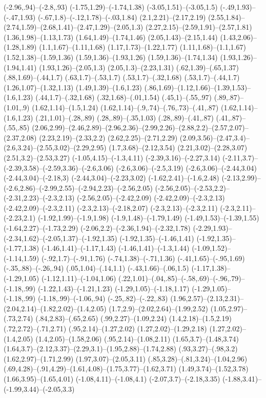 {(-2.96,.94)--(-2.8,.93) (-1.75,1.29)--(-1.74,1.38) (-3.05,1.51)--(-3.05,1.5) (-.49,1.93)--(-.47,1.93) (-.67,1.8)--(-.12,1.78)--(-.03,1.84) (2.1,2.21)--(2.17,2.19) (2.55,1.84)--(2.74,1.59)--(2.68,1.41)--(2.47,1.29)--(2.05,1.3) (2.27,2.15)--(2.59,1.91)--(2.57,1.81) (1.36,1.98)--(1.13,1.73) (1.64,1.49)--(1.74,1.46) (2.05,1.43)--(2.15,1.44) (1.43,2.06)--(1.28,1.89) (1.1,1.67)--(1.11,1.68) (1.17,1.73)--(1.22,1.77) (1.11,1.68)--(1.1,1.67) (1.52,1.38)--(1.59,1.36) (1.59,1.36)--(1.93,1.26) (1.59,1.36)--(1.74,1.34) (1.93,1.26)--(1.94,1.41) (1.93,1.26)--(2.05,1.3) (2.05,1.3)--(2.23,1.31) (.62,1.39)--(.65,1.37) (.88,1.69)--(.44,1.7) (.63,1.7)--(.53,1.7) (.53,1.7)--(.32,1.68) (.53,1.7)--(.44,1.7) (1.26,1.07)--(1.32,1.13) (1.49,1.39)--(1.6,1.23) (.86,1.69)--(1.12,1.66)--(1.39,1.53)--(1.6,1.23) (.44,1.7)--(.32,1.68) (.32,1.68)--(.01,1.54) (.45,1)--(.55,.97) (.89,.87)--(1.01,.9) (1.62,1.14)--(1.5,1.24) (1.62,1.14)--(.9,.74)--(.76,.73)--(.41,.87) (1.62,1.14)--(1.6,1.23) (.21,1.01)--(.28,.89) (.28,.89)--(.35,1.03) (.28,.89)--(.41,.87) (.41,.87)--(.55,.85) (2.06,2.99)--(2.46,2.89)--(2.96,2.36)--(2.99,2.26)--(2.88,2.2)--(2.57,2.07)--(2.37,2.08) (2.23,2.19)--(2.33,2.2) (2.62,2.25)--(2.71,2.29) (2.09,3.56)--(2.47,3.4)--(2.6,3.24)--(2.55,3.02)--(2.29,2.95) (1.7,3.68)--(2.12,3.54) (2.21,3.02)--(2.28,3.07) (2.51,3.2)--(2.53,3.27) (-1.05,4.15)--(-1.3,4.11) (-2.39,3.16)--(-2.27,3.14) (-2.11,3.7)--(-2.39,3.58)--(-2.59,3.36)--(-2.6,3.06) (-2.6,3.06)--(-2.5,3.19) (-2.6,3.06)--(-2.44,3.04) (-2.44,3.04)--(-2.18,3) (-2.44,3.04)--(-2.23,3.02) (-1.62,2.41)--(-1.6,2.48) (-2.13,2.99)--(-2.6,2.86)--(-2.99,2.55)--(-2.94,2.23)--(-2.56,2.05) (-2.56,2.05)--(-2.53,2.2)--(-2.31,2.23)--(-2.3,2.13) (-2.56,2.05)--(-2.42,2.09) (-2.42,2.09)--(-2.3,2.13) (-2.42,2.09)--(-2.3,2.11) (-2.3,2.13)--(-2.18,2.07) (-2.3,2.13)--(-2.3,2.11) (-2.3,2.11)--(-2.23,2.1) (-1.92,1.99)--(-1.9,1.98) (-1.9,1.48)--(-1.79,1.49) (-1.49,1.53)--(-1.39,1.55) (-1.64,2.27)--(-1.73,2.29) (-2.06,2.2)--(-2.36,1.94)--(-2.32,1.78) (-2.29,1.93)--(-2.34,1.62)--(-2.05,1.37)--(-1.92,1.35) (-1.92,1.35)--(-1.46,1.41) (-1.92,1.35)--(-1.77,1.38) (-1.46,1.41)--(-1.17,1.43) (-1.46,1.41)--(-1.3,1.44) (-1.09,1.52)--(-1.14,1.59) (-.92,1.7)--(-.91,1.76) (-.74,1.38)--(-.71,1.36) (-.41,1.65)--(-.95,1.69) (-.35,.88)--(-.26,.94) (.05,1.04)--(.14,1.1) (-.43,1.66)--(.06,1.5) (-1.17,1.38)--(-1.29,1.05) (-1.12,1.11)--(-1.04,1.06) (.22,1.01)--(.04,.85)--(-.58,.69)--(-.96,.79)--(-1.18,.99) (-1.22,1.43)--(-1.21,1.23) (-1.29,1.05)--(-1.18,1.17) (-1.29,1.05)--(-1.18,.99) (-1.18,.99)--(-1.06,.94) (-.25,.82)--(-.22,.83) (1.96,2.57)--(2.13,2.31)--(2.04,2.14)--(1.82,2.02)--(1.4,2.05) (1.7,2.9)--(2.02,2.64)--(1.99,2.52) (1.05,2.97)--(.73,2.74) (.84,2.83)--(.65,2.65) (.99,2.27)--(1.09,2.24) (1.4,2.18)--(1.5,2.19) (.72,2.72)--(.71,2.71) (.95,2.14)--(1.27,2.02) (1.27,2.02)--(1.29,2.18) (1.27,2.02)--(1.4,2.05) (1.4,2.05)--(1.58,2.06) (.95,2.14)--(1.08,2.11) (1.65,3.7)--(1.48,3.74) (1.64,3.7)--(2.12,3.37)--(2.29,3.1)--(1.95,2.88)--(1.74,2.88) (.93,3.27)--(.98,3.2) (1.62,2.97)--(1.71,2.99) (1.97,3.07)--(2.05,3.11) (.85,3.28)--(.81,3.24)--(1.04,2.96) (.69,4.28)--(.91,4.29)--(1.61,4.08)--(1.75,3.77)--(1.62,3.71) (1.49,3.74)--(1.52,3.78) (1.66,3.95)--(1.65,4.01) (-1.08,4.11)--(-1.08,4.1) (-2.07,3.7)--(-2.18,3.35) (-1.88,3.41)--(-1.99,3.44)--(-2.05,3.3) }
